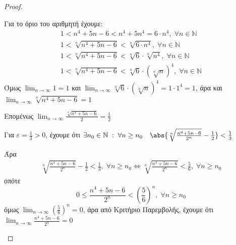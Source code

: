 \begin{enumerate}
\begin{enumerate}[i)]
\begin{proof}
\begin{description}
                            Για το όριο του αριθμητή έχουμε:
                            \begin{gather*}
                                1<n^{4}+5n-6<n^{4}+5n^{4}=6\cdot n^{4}, \; 
                                \forall n \in \mathbb{N} \\
                                1 < \sqrt[n]{n^{4}+5n-6} < \sqrt[n]{6\cdot n^{4}}, \; 
                                \forall n \in \mathbb{N} \\
                                1 < \sqrt[n]{n^{4}+5n-6} < \sqrt[n]{6} \cdot \sqrt[n]{n^{4}}, 
                                \; \forall n \in \mathbb{N} \\
                                1 < \sqrt[n]{n^{4}+5n-6} < \sqrt[n]{6} \cdot (\sqrt[n]{n})^{4},
                                \; \forall n \in \mathbb{N}
                            \end{gather*} 
                            Όμως $ \lim_{n \to \infty} 1 = 1 $ και $ \lim_{n \to \infty} 
                            \sqrt[n]{6} \cdot (\sqrt[n]{n} )^{4} = 1 \cdot 1^{4} =1 $, άρα 
                            και $ \lim_{n \to \infty} \sqrt[n]{n^{4}+5n-6} = 1 $

                            Επομένως $ \lim_{n \to \infty} \frac{\sqrt[n]{n^{4}+5n-6}}{2} = 
                            \frac{1}{2} $

                            Για $ \varepsilon = \frac{1}{3} >0 $, έχουμε ότι 
                            $ \exists n_{0} \in \mathbb{N} \; : \; \forall n \geq n_{0} 
                            \quad \abs{\sqrt[n]{\frac{n^{4}+5n-6}{2^{n}}} - \frac{1}{2}} < 
                            \frac{1}{3} $

                            Άρα 
                            \begin{gather*}
                                \sqrt[n]{\frac{n^{4}+5n-6}{2^{n}}} - \frac{1}{2} < 
                                \frac{1}{3}, \; \forall n \geq n_{0} \Leftrightarrow  
                                \sqrt[n]{\frac{n^{4}+5n-6}{2^{n}}} < \frac{5}{6}, \;
                                \forall n \geq n_{0} 
                            \end{gather*}
                            οπότε 
                            \[
                                0 \leq \frac{n^{4}+5n-6}{2^{n}} < 
                                \left(\frac{5}{6} \right)^{n}, \; \forall n \geq n_{0} 
                            \] 
                            όμως $ \lim_{n \to \infty} \left(\frac{5}{6} \right)^{n} = 0 $,
                            άρα από Κριτήριο Παρεμβολής, έχουμε ότι 
                            $ \lim_{n \to \infty} \frac{n^{4}+5n-6}{2^{n}} = 0 $
                            

\end{description}
\end{proof}
\end{enumerate}
\end{enumerate}
